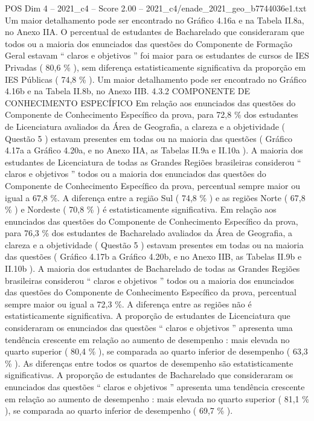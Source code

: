 \begin{textsample}{POS Dim 4 – 2021\_c4 – Score 2.00 – 2021\_c4/enade\_2021\_geo\_b7744036e1.txt}
Um maior detalhamento pode ser encontrado no Gráfico 4.16a e na Tabela II.8a, no Anexo IIA.
O percentual de estudantes de Bacharelado que consideraram que todos ou a maioria dos enunciados das questões do Componente de Formação Geral estavam “ claros e objetivos ” foi maior para os estudantes de cursos de IES Privadas ( 80,6 \% ), sem diferença estatisticamente significativa da proporção em IES Públicas ( 74,8 \% ).
Um maior detalhamento pode ser encontrado no Gráfico 4.16b e na Tabela II.8b, no Anexo IIB. 4.3.2 COMPONENTE DE CONHECIMENTO ESPECÍFICO Em relação aos enunciados das questões do Componente de Conhecimento Específico da prova, para 72,8 \% dos estudantes de Licenciatura avaliados da Área de Geografia, a clareza e a objetividade ( Questão 5 ) estavam presentes em todas ou na maioria das questões ( Gráfico 4.17a a Gráfico 4.20a, e no Anexo IIA, as Tabelas II.9a e II.10a ).
A maioria dos estudantes de Licenciatura de todas as Grandes Regiões brasileiras considerou “ claros e objetivos ” todos ou a maioria dos enunciados das questões do Componente de Conhecimento Específico da prova, percentual sempre maior ou igual a 67,8 \%.
A diferença entre a região Sul ( 74,8 \% ) e as regiões Norte ( 67,8 \% ) e Nordeste ( 70,8 \% ) é estatisticamente significativa.
Em relação aos enunciados das questões do Componente de Conhecimento Específico da prova, para 76,3 \% dos estudantes de Bacharelado avaliados da Área de Geografia, a clareza e a objetividade ( Questão 5 ) estavam presentes em todas ou na maioria das questões ( Gráfico 4.17b a Gráfico 4.20b, e no Anexo IIB, as Tabelas II.9b e II.10b ).
A maioria dos estudantes de Bacharelado de todas as Grandes Regiões brasileiras considerou “ claros e objetivos ” todos ou a maioria dos enunciados das questões do Componente de Conhecimento Específico da prova, percentual sempre maior ou igual a 72,3 \%.
A diferença entre as regiões não é estatisticamente significativa.
A proporção de estudantes de Licenciatura que consideraram os enunciados das questões “ claros e objetivos ” apresenta uma tendência crescente em relação ao aumento de desempenho : mais elevada no quarto superior ( 80,4 \% ), se comparada ao quarto inferior de desempenho ( 63,3 \% ).
As diferenças entre todos os quartos de desempenho são estatisticamente significativas.
A proporção de estudantes de Bacharelado que consideraram os enunciados das questões “ claros e objetivos ” apresenta uma tendência crescente em relação ao aumento de desempenho : mais elevada no quarto superior ( 81,1 \% ), se comparada ao quarto inferior de desempenho ( 69,7 \% ).

\end{textsample}
